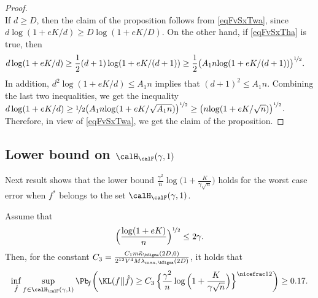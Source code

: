 \begin{proof}
\begin{equation}
\end{equation}
If $d\ge D$, then the claim of the proposition follows from \eqref{eqFvSxTwa}, since
$d\log(1+eK/d)\ge D\log(1+eK/D)$. On the other hand, if \eqref{eqFvSxTha} is true, then
\begin{align}
  d\log(1+eK/d) 
    &\ge \frac12 (d+1)\log(1+eK/(d+1)) 
    \ge \frac12 \big({A_1 n}{\log(1+eK/(d+1))}\big)^{\nicefrac12}.
\end{align}
In addition, $d^2\log(1+eK/d)\le A_1 n$ implies that $(d+1)^2 \le A_1 n$. Combining the last
two inequalities, we get the inequality $d\log(1+eK/d)  \ge \nicefrac12 \big({A_1 n}{\log(1+eK/\sqrt{A_1n})}\big)^{\nicefrac12}\ge  \big({n}{\log(1+eK/\sqrt{n})}\big)^{\nicefrac12}$. 
Therefore, in view of \eqref{eqFvSxTwa}, we get the claim of the proposition.
\end{proof}


\subsection{Lower bound on $\calH_\calF(\gamma,1)$} %

Next result shows that the lower bound ${\frac{\gamma^2}n\log\big(1+\frac{K}{\gamma\sqrt{n}}\big)}$ 
holds for the worst case error when $f^*$ belongs to the set $\calH_\calF(\gamma,1)$. 
\begin{proposition}\label{prop:lower:2}
Assume that
\begin{equation}
\Big(\frac{\log(1+eK)}{n}\Big)^{\nicefrac12}\le 2\gamma.
\end{equation}
Then, for the constant $C_3 =
\frac{C_1 m \bar\kappa_{\bSigma}(2D,0) }{2^{12}V^4 M\lambda_{\max,\bSigma}(2D)}$,
it holds that
\begin{equation}
\inf_{\hat f}\sup_{f \in \calH_\calF(\gamma,1)}\Pb\!_{f}\bigg(\KL(f||\hat f)\geq
C_3\,\Big\{{\frac{\gamma^2}n\log\Big(1+\frac{K}{\gamma\sqrt{n}}\Big)}\Big\}^{\nicefrac12}\bigg)\geq 0.17.
\end{equation}
\end{proposition}


